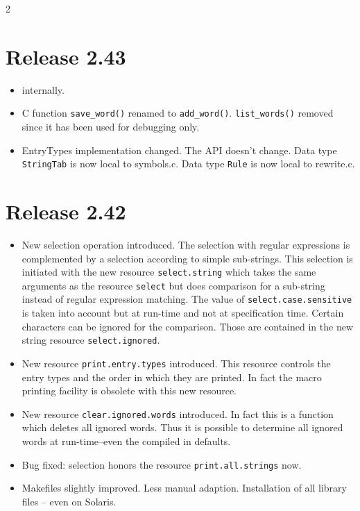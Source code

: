 \documentclass[11pt,a4paper]{scrartcl}
\newcommand\rsc[1]{\texttt{#1}}
\newcommand\File[1]{\textsf{#1}}
\newenvironment{Releases}{\begin{multicols}2\RaggedRight}{\end{multicols}}
\newenvironment{Release}[2]{%
  \def\tmp{#2}%
  \section*{Release #1 \ifx\tmp\empty\else{\normalsize[#2]}\fi}
  \begin{itemize}
}{\end{itemize}}
\newenvironment{Fix}[1]{\item }{}
\newenvironment{New}[1]{\item }{}
\newenvironment{Update}[1]{\item }{}
\begin{document}
\begin{Releases}
\begin{Release}{2.43}{}
\begin{New}{gene}
    internally.
  \end{New}
  \begin{Update}{gene}
    C function \verb|save_word()| renamed to \verb|add_word()|.
    \verb|list_words()| removed since it has been used for debugging
    only.
  \end{Update}
  \begin{Update}{gene}
    EntryTypes implementation changed. The API doesn't change.
    Data type \verb|StringTab| is now local to \File{symbols.c}.
    Data type \verb|Rule| is now local to \File{rewrite.c}.
  \end{Update}
 \end{Release}

 \begin{Release}{2.42}{}
  \begin{New}{gene}
    New selection operation introduced. The selection with regular expressions
    is complemented by a selection according to simple sub-strings. This
    selection is initiated with the new resource \rsc{select.string}
    which takes the same arguments as the resource \rsc{select} but
    does comparison for a sub-string instead of regular expression matching.
    The value of \rsc{select.case.sensitive} is taken into account but
    at run-time and not at specification time. Certain characters can be
    ignored for the comparison. Those are contained in the new string resource
    \rsc{select.ignored}.
  \end{New}
  \begin{New}{gene}
    New resource \rsc{print.entry.types} introduced. This resource
    controls the entry types and the order in which they are printed.
    In fact the macro printing facility is obsolete with this new
    resource.
  \end{New}
  \begin{New}{gene}
    New resource \rsc{clear.ignored.words} introduced. In fact this is
    a function which deletes all ignored words. Thus it is possible to
    determine all ignored words at run-time--even the compiled in
    defaults.
  \end{New}
  \begin{Fix}{gene}
    Bug fixed: selection honors the resource \rsc{print.all.strings}
    now.
  \end{Fix}
  \begin{Update}{gene}
    Makefiles slightly improved. Less manual adaption. Installation of all
    library files -- even on Solaris.

\end{Update}
\end{Release}
\end{Releases}
\end{document}
